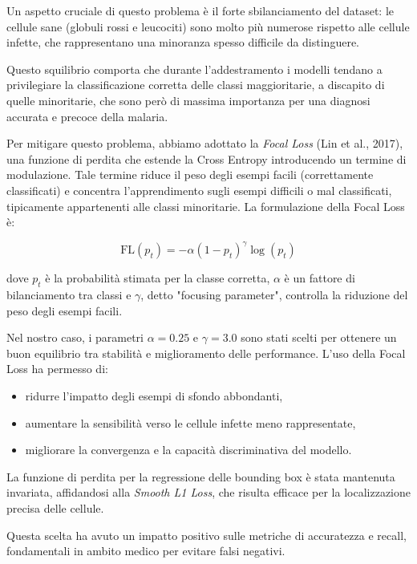 \documentclass[minted, draw]{../tex/hebdomon}
\begin{document}
Un aspetto cruciale di questo problema è il forte sbilanciamento del dataset: le cellule sane (globuli rossi e leucociti) sono molto più numerose rispetto alle cellule infette, che rappresentano una minoranza spesso difficile da distinguere.

Questo squilibrio comporta che durante l’addestramento i modelli tendano a privilegiare la classificazione corretta delle classi maggioritarie, a discapito di quelle minoritarie, che sono però di massima importanza per una diagnosi accurata e precoce della malaria.

Per mitigare questo problema, abbiamo adottato la \textit{Focal Loss} (Lin et al., 2017), una funzione di perdita che estende la Cross Entropy introducendo un termine di modulazione. Tale termine riduce il peso degli esempi facili (correttamente classificati) e concentra l’apprendimento sugli esempi difficili o mal classificati, tipicamente appartenenti alle classi minoritarie. La formulazione della Focal Loss è:

\[
\text{FL}(p_t) = -\alpha (1 - p_t)^\gamma \log(p_t)
\]

dove \( p_t \) è la probabilità stimata per la classe corretta, \(\alpha\) è un fattore di bilanciamento tra classi e \(\gamma\), detto "focusing parameter", controlla la riduzione del peso degli esempi facili.

Nel nostro caso, i parametri \(\alpha = 0.25\) e \(\gamma = 3.0\) sono stati scelti per ottenere un buon equilibrio tra stabilità e miglioramento delle performance. L’uso della Focal Loss ha permesso di:

\begin{itemize}
    \item ridurre l’impatto degli esempi di sfondo abbondanti,
    \item aumentare la sensibilità verso le cellule infette meno rappresentate,
    \item migliorare la convergenza e la capacità discriminativa del modello.
\end{itemize}

La funzione di perdita per la regressione delle bounding box è stata mantenuta invariata, affidandosi alla \textit{Smooth L1 Loss}, che risulta efficace per la localizzazione precisa delle cellule.

Questa scelta ha avuto un impatto positivo sulle metriche di accuratezza e recall, fondamentali in ambito medico per evitare falsi negativi.


\end{document}
